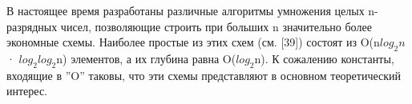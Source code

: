 \documentclass[a4paper,12pt]{book}[2018/09/03]
\begin{document}
В настоящее время разработаны различные алгоритмы умножения целых n-разрядных чисел, позволяющие строить при больших n значительно более экономные схемы. Наиболее простые из этих схем (см. [39]) состоят из O(n$log_2n$ · $log_{2}$$log_{2}$n) элементов, а их глубина равна O($log_{2}$n). К сожалению константы, входящие в ”O” таковы, что эти схемы представляют в основном теоретический интерес.
\end{document}
